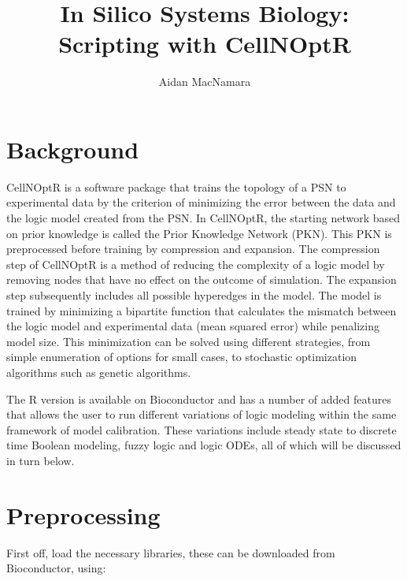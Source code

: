 \documentclass{article}
\title{In Silico Systems Biology: Scripting with CellNOptR}
\author{Aidan MacNamara}
\begin{document}

\maketitle

\tableofcontents

\section{Background}

CellNOptR is a software package that trains the topology of a PSN to experimental data by the criterion of minimizing the error between the data and the logic model created from the PSN. In CellNOptR, the starting network based on prior knowledge is called the Prior Knowledge Network (PKN). This PKN is preprocessed before training by compression and expansion. The compression step of CellNOptR is a method of reducing the complexity of a logic model by removing nodes that have no effect on the outcome of simulation. The expansion step subsequently includes all possible hyperedges in the model. The model is trained by minimizing a bipartite function that calculates the mismatch between the logic model and experimental data (mean squared error) while penalizing model size. This minimization can be solved using different strategies, from simple enumeration of options for small cases, to stochastic optimization algorithms such as genetic algorithms.

The R version is available on Bioconductor and has a number of added features that allows the user to run different variations of logic modeling within the same framework of model calibration. These variations include steady state to discrete time Boolean modeling, fuzzy logic and logic ODEs, all of which will be discussed in turn below.


\section{Preprocessing}

First off, load the necessary libraries, these can be downloaded from Bioconductor, using:
\end{document}
